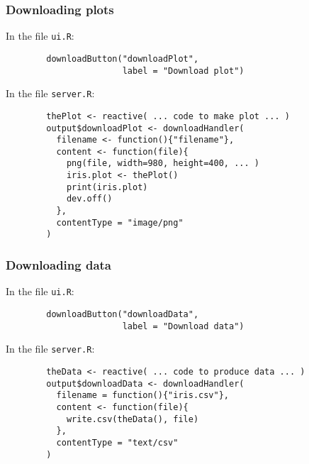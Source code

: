 \documentclass{beamer}
\begin{document}
	\begin{frame}[fragile]
		\frametitle{Downloading plots}

		In the file \verb|ui.R|:
		
		\begin{exampleblock}{}
		\begin{BVerbatim}
		downloadButton("downloadPlot",
		               label = "Download plot")
		\end{BVerbatim}
		\end{exampleblock}{}

		In the file \verb|server.R|:
		
		\begin{exampleblock}{}
		\begin{BVerbatim}
		thePlot <- reactive( ... code to make plot ... )
		output$downloadPlot <- downloadHandler(
		  filename <- function(){"filename"},
		  content <- function(file){
		    png(file, width=980, height=400, ... )
		    iris.plot <- thePlot()
		    print(iris.plot)
		    dev.off()
		  },
		  contentType = "image/png"
		)
		\end{BVerbatim}
		\end{exampleblock}{}

	\end{frame}

	\begin{frame}[fragile]
		\frametitle{Downloading data}

		In the file \verb|ui.R|:
		
		\begin{exampleblock}{}
		\begin{BVerbatim}
		downloadButton("downloadData",
		               label = "Download data")
		\end{BVerbatim}
		\end{exampleblock}{}

		\vspace{1em}

		In the file \verb|server.R|:
		
		\begin{exampleblock}{}
		\begin{BVerbatim}
		theData <- reactive( ... code to produce data ... )
		output$downloadData <- downloadHandler(
		  filename = function(){"iris.csv"},
		  content <- function(file){
		    write.csv(theData(), file)
		  },
		  contentType = "text/csv"
		)
		\end{BVerbatim}
		\end{exampleblock}{}

	\end{frame}
\end{document}
